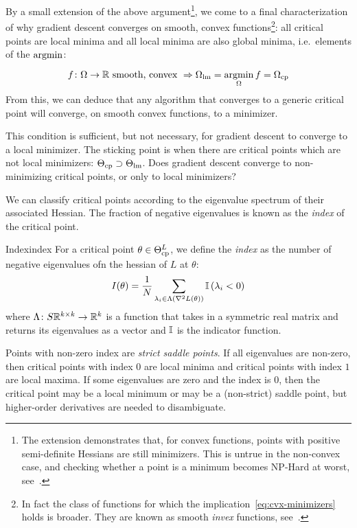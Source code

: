 \documentclass[../../thesis.tex]{subfiles}
\begin{document}
By a small extension of the above
argument\footnote{The extension demonstrates that,
for convex functions,
points with positive semi-definite Hessians
are still minimizers.
This is untrue in the non-convex case,
and checking whether a point is a minimum becomes NP-Hard at worst,
see~\cite{murty1987}.},
we come to a final characterization
of why gradient descent converges on smooth, convex
functions\footnote{In fact
the class of functions for which the implication~\ref{eq:cvx-minimizers}
holds is broader.
They are known as smooth \emph{invex} functions,
see~\cite{invex2008}.}:
all critical points are local minima
and all local minima are also global minima,
i.e.~elements of the $\mathop{\mathrm{argmin}}$:

\begin{equation}\equationlabel{cvx-minimizers}
	f\from\Omega\to\R \text{\ smooth, convex\ }
	\Rightarrow \Omega_{\lm} = \argmin_{\Omega} f = \Omega_{\cp}
\end{equation}
\noindent From this, we can deduce
that any algorithm that converges to a generic critical point will converge,
on smooth convex functions, to a minimizer.

This condition is sufficient, but not necessary,
for gradient descent to converge to a local minimizer.
The sticking point is when there are
critical points which are not local minimizers:
$\Theta_{\mathrm{cp}} \supset \Theta_{\mathrm{lm}}$.
Does gradient descent converge to non-minimizing critical points,
or only to local minimizers?

We can classify critical points according to the
eigenvalue spectrum of their associated Hessian.
The fraction of negative eigenvalues is known as the
\emph{index} of the critical point.

\begin{definition}{Index}{index}
	For a critical point $\theta\in\Theta^L_{\mathrm{cp}}$,
	we define the \emph{index}
	as the number of negative eigenvalues
	ofn the hessian of $L$ at $\theta$:
	\begin{equation}\equationlabel{def-index}
		I(\theta) = \frac{1}{N}
		\sum_{\lambda_i \in \Lambda\left(\hess{L}{\theta}\right)}%
		{\Ind\left(\lambda_i < 0\right)}
	\end{equation}
	where $\Lambda\colon S\mathbb{R}^{k\times k}\to\mathbb{R}^k$
	is a function that takes in a symmetric real matrix
	and returns its eigenvalues as a vector
	and $\mathbb{I}$ is the indicator function.
\end{definition}

Points with non-zero index are \emph{strict saddle points}.
If all eigenvalues are non-zero,
then critical points with index $0$ are local minima
and critical points with index $1$ are local maxima.
If some eigenvalues are zero and the index is $0$,
then the critical point may be a local minimum
or may be a (non-strict) saddle point,
but higher-order derivatives are needed to disambiguate.
\end{document}

